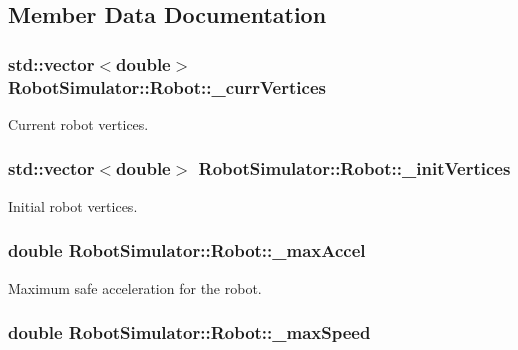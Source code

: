\subsection{Member Data Documentation}
\hypertarget{structRobotSimulator_1_1Robot_acc4b3b442e3739589a5b7a3597988df2}{
\subsubsection[{\-\_\-curr\-Vertices}]{\setlength{\rightskip}{0pt plus 5cm}std\-::vector$<$double$>$ Robot\-Simulator\-::\-Robot\-::\-\_\-curr\-Vertices}}\label{structRobotSimulator_1_1Robot_acc4b3b442e3739589a5b7a3597988df2}
Current robot vertices. \hypertarget{structRobotSimulator_1_1Robot_ab7ac2c4dd487006e5e563ad0341808fb}{
\subsubsection[{\-\_\-init\-Vertices}]{\setlength{\rightskip}{0pt plus 5cm}std\-::vector$<$double$>$ Robot\-Simulator\-::\-Robot\-::\-\_\-init\-Vertices}}\label{structRobotSimulator_1_1Robot_ab7ac2c4dd487006e5e563ad0341808fb}
Initial robot vertices. \hypertarget{structRobotSimulator_1_1Robot_a34048992e382edb88e15cbee3741e7ed}{
\subsubsection[{\-\_\-max\-Accel}]{\setlength{\rightskip}{0pt plus 5cm}double Robot\-Simulator\-::\-Robot\-::\-\_\-max\-Accel}}\label{structRobotSimulator_1_1Robot_a34048992e382edb88e15cbee3741e7ed}
Maximum safe acceleration for the robot. \hypertarget{structRobotSimulator_1_1Robot_a25f9d011ee0c6952950b63405286438b}{
\subsubsection[{\-\_\-max\-Speed}]{\setlength{\rightskip}{0pt plus 5cm}double Robot\-Simulator\-::\-Robot\-::\-\_\-max\-Speed}}\label{structRobotSimulator_1_1Robot_a25f9d011ee0c6952950b63405286438b}
